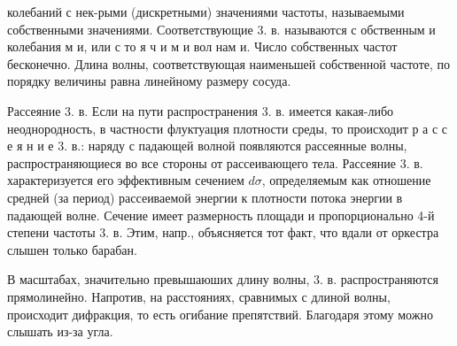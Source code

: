 \documentclass[10pt]{article}
\begin{document}
колебаний с нек-рыми (дискретными) значениями частоты, называемыми собственными значениями. Соответствующие 3. в. называются с обственным и колебания м и, или с то я ч и м и вол нам и. Число собственных частот бесконечно. Длина волны, соответствующая наименьшей собственной частоте, по порядку величины равна линейному размеру сосуда.



Рассеяние 3. в. Если на пути распространения 3. в. имеется какая-либо неоднородность, в частности флуктуация плотности среды, то происходит р а с с е я н и е 3. в.: наряду с падающей волной появляются рассеянные волны, распространяющиеся во все стороны от рассеивающего тела. Рассеяние 3. в. характеризуется его эффективным сечением $d \sigma$, определяемым как отношение средней (за период) рассеиваемой энергии к плотности потока энергии в падающей волне. Сечение имеет размерность площади и пропорционально 4-й степени частоты 3. в. Этим, напр., объясняется тот факт, что вдали от оркестра слышен только барабан.



В масштабах, значительно превышаюших длину волны, 3. в. распространяются прямолинейно. Напротив, на расстояниях, сравнимых с длиной волны, происходит дифракция, то есть огибание препятствий. Благодаря этому можно слышать из-за угла.
\end{document}
